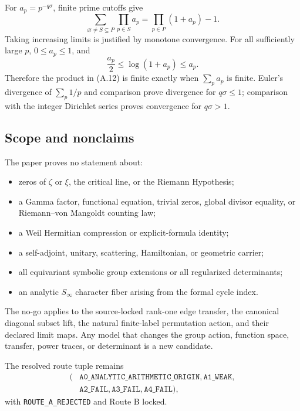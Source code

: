 For $a_p=p^{-q\sigma}$, finite prime cutoffs give
\[
  \sum_{\varnothing\ne S\subseteq P}\prod_{p\in S}a_p
  =\prod_{p\in P}(1+a_p)-1.
  \tag{A.12}
\]
Taking increasing limits is justified by monotone convergence.  For all
sufficiently large $p$, $0\le a_p\le1$, and
\[
  \frac{a_p}{2}\le\log(1+a_p)\le a_p.
  \tag{A.13}
\]
Therefore the product in (A.12) is finite exactly when $\sum_pa_p$ is
finite.  Euler's divergence of $\sum_p1/p$ and comparison prove divergence
for $q\sigma\le1$; comparison with the integer Dirichlet series proves
convergence for $q\sigma>1$.

\subsection{Scope and nonclaims}

The paper proves no statement about:

\begin{itemize}
\item zeros of $\zeta$ or $\xi$, the critical line, or the Riemann
  Hypothesis;
\item a Gamma factor, functional equation, trivial zeros, global divisor
  equality, or Riemann--von Mangoldt counting law;
\item a Weil Hermitian compression or explicit-formula identity;
\item a self-adjoint, unitary, scattering, Hamiltonian, or geometric carrier;
\item all equivariant symbolic group extensions or all regularized
  determinants;
\item an analytic $S_\infty$ character fiber arising from the formal cycle
  index.
\end{itemize}

The no-go applies to the source-locked rank-one edge transfer, the canonical
diagonal subset lift, the natural finite-label permutation action, and their
declared limit maps.  Any model that changes the group action, function
space, transfer, power traces, or determinant is a new candidate.

The resolved route tuple remains
\[
\begin{split}
(&\texttt{A0\_ANALYTIC\_ARITHMETIC\_ORIGIN},
  \texttt{A1\_WEAK},\\
 &\texttt{A2\_FAIL},\texttt{A3\_FAIL},\texttt{A4\_FAIL}),
\end{split}
\]
with \texttt{ROUTE\_A\_REJECTED} and Route B locked.
